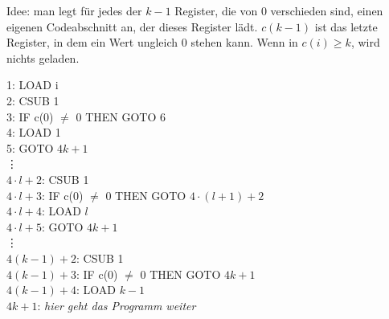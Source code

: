 Idee: man legt für jedes der $k-1$ Register, die von $0$ verschieden sind, einen eigenen Codeabschnitt an, der dieses Register lädt. $c(k-1)$ ist das letzte Register, in dem ein Wert ungleich 0 stehen kann. Wenn in $c(i) \geq k$, wird nichts geladen.

1: LOAD i \\
2: CSUB 1 \\
3: IF c(0) $\neq$ 0 THEN GOTO 6 \\
4: LOAD 1 \\
5: GOTO $4k + 1$ \\
\vdots \\
$4 \cdot l + 2$: CSUB 1 \\
$4 \cdot l + 3$: IF c(0) $\neq$ 0 THEN GOTO $4 \cdot (l + 1) + 2$ \\
$4 \cdot l + 4$: LOAD $l$ \\
$4 \cdot l + 5$: GOTO $4k + 1$ \\
\vdots \\
$4(k-1) + 2$: CSUB 1\\
$4(k-1) + 3$: IF c(0) $\neq$ 0 THEN GOTO $4k + 1$ \\
$4(k-1) + 4$: LOAD $k-1$ \\
$4k + 1$: \textit{hier geht das Programm weiter}\\